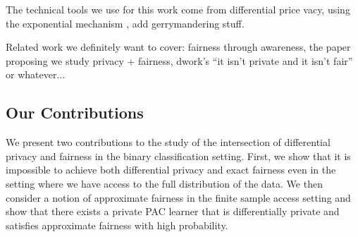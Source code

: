 The technical tools we use for this work come from differential price
vacy, using the exponential mechanism \cite{2dplimits}, add gerrymandering stuff.



Related work we definitely want to cover: fairness through awareness,
the paper proposing we study privacy + fairness, dwork's ``it isn't
private and it isn't fair'' or whatever...

\subsection{Our Contributions}
We present two contributions to the study of the intersection of
differential privacy and fairness in the binary classification setting.
First, we show that it is impossible to achieve both differential
privacy and exact fairness even in the setting where we have access to
the full distribution of the data. We then consider a notion of
approximate fairness in the finite sample access setting and show that
there exists a private PAC learner that is differentially private and
satisfies approximate fairness with high probability. 

